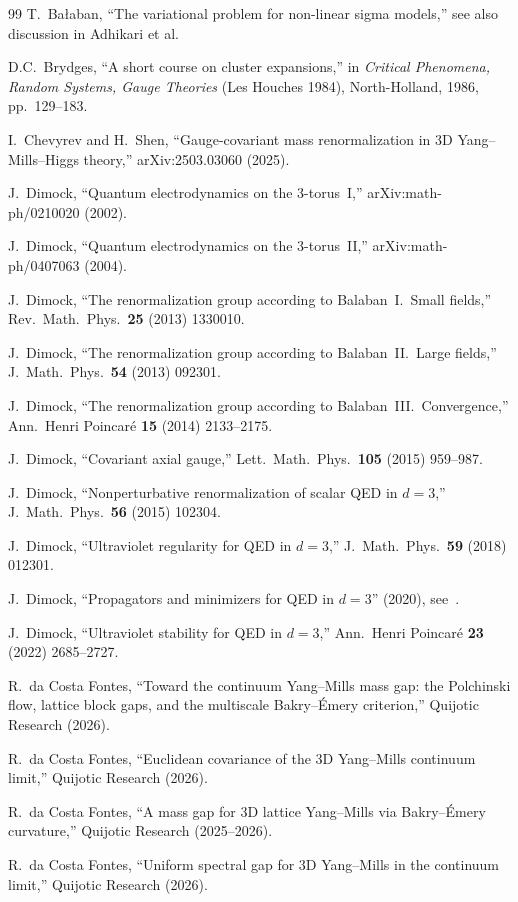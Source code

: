 \documentclass[11pt,a4paper]{article}
\theoremstyle{plain}
\theoremstyle{definition}
\theoremstyle{remark}
\begin{document}
\begin{thebibliography}{99}
 T.~Ba{\l}aban, ``The variational
  problem for non-linear sigma models,''
  see also discussion in Adhikari et al.

 D.C.~Brydges, ``A short course on
  cluster expansions,'' in \emph{Critical Phenomena,
  Random Systems, Gauge Theories} (Les Houches 1984),
  North-Holland, 1986, pp.~129--183.

 I.~Chevyrev and H.~Shen, ``Gauge-covariant
  mass renormalization in 3D Yang--Mills--Higgs theory,''
  arXiv:2503.03060 (2025).

 J.~Dimock, ``Quantum electrodynamics
  on the 3-torus~I,'' arXiv:math-ph/0210020 (2002).

 J.~Dimock, ``Quantum electrodynamics
  on the 3-torus~II,'' arXiv:math-ph/0407063 (2004).

 J.~Dimock, ``The renormalization group
  according to Balaban~I.~Small fields,''
  Rev.\ Math.\ Phys.\ \textbf{25} (2013) 1330010.

 J.~Dimock, ``The renormalization group
  according to Balaban~II.~Large fields,''
  J.~Math.\ Phys.\ \textbf{54} (2013) 092301.

 J.~Dimock, ``The renormalization group
  according to Balaban~III.~Convergence,''
  Ann.\ Henri Poincar\'e \textbf{15} (2014) 2133--2175.

 J.~Dimock, ``Covariant axial gauge,''
  Lett.\ Math.\ Phys.\ \textbf{105} (2015) 959--987.

 J.~Dimock, ``Nonperturbative
  renormalization of scalar QED in $d=3$,''
  J.~Math.\ Phys.\ \textbf{56} (2015) 102304.

 J.~Dimock, ``Ultraviolet regularity
  for QED in $d=3$,''
  J.~Math.\ Phys.\ \textbf{59} (2018) 012301.

 J.~Dimock, ``Propagators and minimizers
  for QED in $d=3$'' (2020), see~\cite{Dimock22}.

 J.~Dimock, ``Ultraviolet stability
  for QED in $d=3$,''
  Ann.\ Henri Poincar\'e \textbf{23} (2022) 2685--2727.

 R.~da Costa Fontes, ``Toward the
  continuum Yang--Mills mass gap: the Polchinski flow,
  lattice block gaps, and the multiscale Bakry--\'Emery
  criterion,'' Quijotic Research (2026).

 R.~da Costa Fontes, ``Euclidean
  covariance of the 3D Yang--Mills continuum limit,''
  Quijotic Research (2026).

 R.~da Costa Fontes, ``A mass gap for
  3D lattice Yang--Mills via Bakry--\'Emery curvature,''
  Quijotic Research (2025--2026).

 R.~da Costa Fontes, ``Uniform
  spectral gap for 3D Yang--Mills in the continuum
  limit,'' Quijotic Research (2026).

\end{thebibliography}
\end{document}
